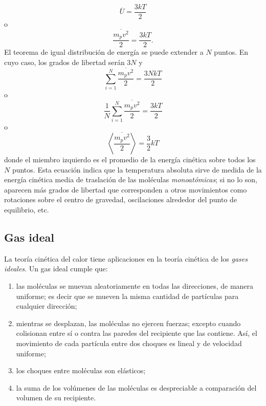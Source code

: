 \documentclass[openany]{book}
\begin{document}
\begin{equation}
	\overline{U}=\frac{3kT}{2}
\end{equation}
o
\begin{equation*}
	\overline{\frac{m_pv^2}{2}}=\frac{3kT}{2}.
\end{equation*}
El teorema de igual distribución de energía se puede extender a $N$ puntos. En cuyo caso, los grados de libertad serán $3N$ y
\begin{equation*}
	\sum_{i=1}^{N}\overline{\frac{m_pv^2}{2}}=\frac{3NkT}{2}
\end{equation*}
o
\begin{equation*}
	\frac{1}{N}\sum_{i=1}^{N}\overline{\frac{m_pv^2}{2}}=\frac{3kT}{2}
\end{equation*}
o
\begin{equation}
	\left<\frac{\overline{m_pv^2}}{2}\right>=\frac{3}{2}kT
\end{equation}
donde el miembro izquierdo es el promedio de la energía cinética sobre todos los $N$ puntos. Esta ecuación indica que la temperatura absoluta sirve de medida de la energía cinética media de traslación de las moléculas \emph{monoatómicas}; si no lo son, aparecen más grados de libertad que corresponden a otros movimientos como rotaciones sobre el centro de gravedad, oscilaciones alrededor del punto de equilibrio, etc.

\subsection{Gas ideal}
La teoría cinética del calor tiene aplicaciones en la teoría cinética de los \emph{gases ideales}. Un gas ideal cumple que:
\renewcommand{\theenumi}{\alph{enumi}}
\renewcommand{\labelenumi}{({\theenumi})}
\begin{enumerate}
	\item las moléculas se muevan aleatoriamente en todas las direcciones, de manera uniforme; es decir que se mueven la misma cantidad de partículas para cualquier dirección;
	\item mientras se desplazan, las moléculas no ejercen fuerzas; excepto cuando colisionan entre sí o contra las paredes del recipiente que las contiene. Así, el movimiento de cada partícula entre dos choques es lineal y de velocidad uniforme;
	\item los choques entre moléculas son elásticos;
	\item la suma de los volúmenes de las moléculas es despreciable a comparación del volumen de su recipiente.
\end{enumerate}
\end{document}
